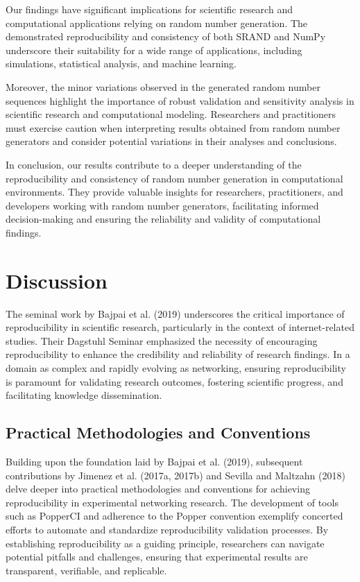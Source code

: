 \documentclass{article}
\begin{document}
Our findings have significant implications for scientific research and computational applications relying on random number generation. The demonstrated reproducibility and consistency of both SRAND and NumPy underscore their suitability for a wide range of applications, including simulations, statistical analysis, and machine learning.

Moreover, the minor variations observed in the generated random number sequences highlight the importance of robust validation and sensitivity analysis in scientific research and computational modeling. Researchers and practitioners must exercise caution when interpreting results obtained from random number generators and consider potential variations in their analyses and conclusions.

In conclusion, our results contribute to a deeper understanding of the reproducibility and consistency of random number generation in computational environments. They provide valuable insights for researchers, practitioners, and developers working with random number generators, facilitating informed decision-making and ensuring the reliability and validity of computational findings.

\section{Discussion}

The seminal work by Bajpai et al. (2019) underscores the critical importance of reproducibility in scientific research, particularly in the context of internet-related studies. Their Dagstuhl Seminar emphasized the necessity of encouraging reproducibility to enhance the credibility and reliability of research findings. In a domain as complex and rapidly evolving as networking, ensuring reproducibility is paramount for validating research outcomes, fostering scientific progress, and facilitating knowledge dissemination.

\subsection{Practical Methodologies and Conventions}

Building upon the foundation laid by Bajpai et al. (2019), subsequent contributions by Jimenez et al. (2017a, 2017b) and Sevilla and Maltzahn (2018) delve deeper into practical methodologies and conventions for achieving reproducibility in experimental networking research. The development of tools such as PopperCI and adherence to the Popper convention exemplify concerted efforts to automate and standardize reproducibility validation processes. By establishing reproducibility as a guiding principle, researchers can navigate potential pitfalls and challenges, ensuring that experimental results are transparent, verifiable, and replicable.
\end{document}
